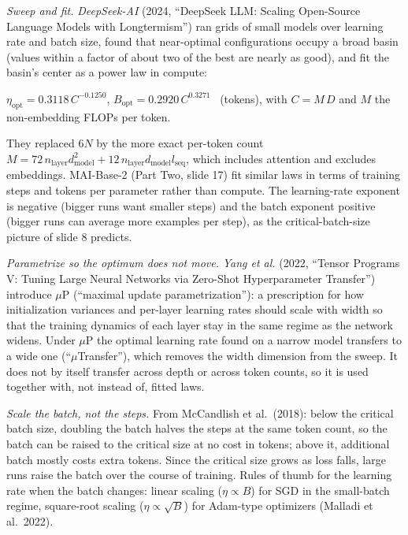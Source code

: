 \documentclass[11pt,letterpaper]{article}
\newenvironment{formulas}{\begin{tcolorbox}[formulabox]}{\end{tcolorbox}}
\begin{document}
\emph{Sweep and fit.} \emph{DeepSeek-AI} (2024, ``DeepSeek LLM: Scaling Open-Source Language Models with Longtermism'') ran grids of small models over learning rate and batch size, found that near-optimal configurations occupy a broad basin (values within a factor of about two of the best are nearly as good), and fit the basin's center as a power law in compute:
\begin{formulas}
$\eta_{\text{opt}}=0.3118\,C^{-0.1250}$, \qquad $B_{\text{opt}}=0.2920\,C^{0.3271}$ \ (tokens), \quad with $C=M\,D$ and $M$ the non-embedding FLOPs per token.
\end{formulas}
They replaced $6N$ by the more exact per-token count $M=72\,n_{\text{layer}}d_{\text{model}}^2+12\,n_{\text{layer}}d_{\text{model}}l_{\text{seq}}$, which includes attention and excludes embeddings. MAI-Base-2 (Part Two, slide 17) fit similar laws in terms of training steps and tokens per parameter rather than compute. The learning-rate exponent is negative (bigger runs want smaller steps) and the batch exponent positive (bigger runs can average more examples per step), as the critical-batch-size picture of slide 8 predicts.

\emph{Parametrize so the optimum does not move.} \emph{Yang et al.} (2022, ``Tensor Programs V: Tuning Large Neural Networks via Zero-Shot Hyperparameter Transfer'') introduce $\mu$P (``maximal update parametrization''): a prescription for how initialization variances and per-layer learning rates should scale with width so that the training dynamics of each layer stay in the same regime as the network widens. Under $\mu$P the optimal learning rate found on a narrow model transfers to a wide one (``$\mu$Transfer''), which removes the width dimension from the sweep. It does not by itself transfer across depth or across token counts, so it is used together with, not instead of, fitted laws.

\emph{Scale the batch, not the steps.} From McCandlish et al.\ (2018): below the critical batch size, doubling the batch halves the steps at the same token count, so the batch can be raised to the critical size at no cost in tokens; above it, additional batch mostly costs extra tokens. Since the critical size grows as loss falls, large runs raise the batch over the course of training. Rules of thumb for the learning rate when the batch changes: linear scaling ($\eta\propto B$) for SGD in the small-batch regime, square-root scaling ($\eta\propto\sqrt{B}$) for Adam-type optimizers (Malladi et al.\ 2022).
\end{document}
